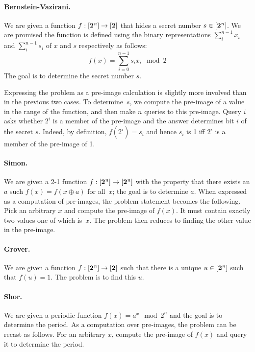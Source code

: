 \documentclass[sigplan,screen]{acmart}
\newcommand{\finset}[1]{[\mathbf{#1}]}
\theoremstyle{definition}
\begin{document}
\paragraph*{Bernstein-Vazirani.}
We are given a function $f : \finset{2^{\it n}} \rightarrow \finset{2}$
that hides a secret number $s \in \finset{2^{\it n}}$. We are promised the
function is defined using the binary representations $\sum_i^{n-1}
x_i$ and $\sum_i^{n-1} s_i$ of $x$ and $s$ respectively as follows:
\[
f(x) = \sum_{i=0}^{n-1} s_ix_i \mod{2}
\]
The goal is to determine the secret number $s$.

Expressing the problem as a pre-image calculation is slightly more
involved than in the previous two cases. To determine~$s$, we compute
the pre-image of a value in the range of the function, and then make
$n$ queries to this pre-image. Query $i$ asks whether $2^i$ is a
member of the pre-image and the answer determines bit $i$ of the
secret $s$. Indeed, by definition, $f(2^i) = s_i$ and hence $s_i$ is 1
iff $2^i$ is a member of the pre-image of 1.

\paragraph*{Simon.}
We are given a 2-1 function $f : \finset{2^{\it n}} \rightarrow
\finset{2^{\it n}}$ with the property that there exists an $a$ such $f(x) =
f(x \oplus a)$ for all~$x$; the goal is to determine $a$. When
expressed as a computation of pre-images, the problem statement
becomes the following. Pick an arbitrary $x$ and compute the pre-image
of $f(x)$. It must contain exactly two values one of which is~$x$. The
problem then reduces to finding the other value in the pre-image.

\paragraph*{Grover.}
We are given a function $f : \finset{2^{\it n}} \rightarrow \finset{2}$
such that there is a unique $u \in \finset{2^{\it n}}$ such that $f(u)=1$.
The problem is to find this $u$.

\paragraph*{Shor.}
We are given a periodic function $f(x) = a^x \mod{2^n}$ and the goal
is to determine the period. As a computation over pre-images, the
problem can be recast as follows. For an arbitrary $x$, compute the
pre-image of $f(x)$ and query it to determine the period.
\end{document}

